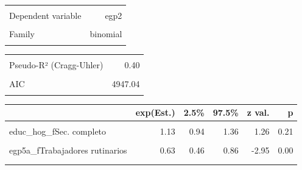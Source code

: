 \documentclass[
]{book}
\begin{document}
\begin{table}[!h]
\centering
\begin{tabular}{lr}
\toprule
\cellcolor{gray!6}{Observations} & \cellcolor{gray!6}{5900 (1560 missing obs. deleted)}\\
Dependent variable & egp2\\
\cellcolor{gray!6}{Type} & \cellcolor{gray!6}{Generalized linear model}\\
Family & binomial\\
\cellcolor{gray!6}{Link} & \cellcolor{gray!6}{logit}\\
\bottomrule
\end{tabular}
\end{table} \begin{table}[!h]
\centering
\begin{tabular}{lr}
\toprule
\cellcolor{gray!6}{$\chi^2$(9)} & \cellcolor{gray!6}{1899.04}\\
Pseudo-R² (Cragg-Uhler) & 0.40\\
\cellcolor{gray!6}{Pseudo-R² (McFadden)} & \cellcolor{gray!6}{0.28}\\
AIC & 4947.04\\
\cellcolor{gray!6}{BIC} & \cellcolor{gray!6}{5013.87}\\
\bottomrule
\end{tabular}
\end{table} \begin{table}[!h]
\centering
\begin{threeparttable}
\begin{tabular}{lrrrrr}
\toprule
  & exp(Est.) & 2.5\% & 97.5\% & z val. & p\\
\midrule
\cellcolor{gray!6}{(Intercept)} & \cellcolor{gray!6}{0.13} & \cellcolor{gray!6}{0.11} & \cellcolor{gray!6}{0.17} & \cellcolor{gray!6}{-16.01} & \cellcolor{gray!6}{0.00}\\
educ\_hog\_fSec. completo & 1.13 & 0.94 & 1.36 & 1.26 & 0.21\\
\cellcolor{gray!6}{educ\_hog\_fSuperior completo} & \cellcolor{gray!6}{1.19} & \cellcolor{gray!6}{0.92} & \cellcolor{gray!6}{1.53} & \cellcolor{gray!6}{1.34} & \cellcolor{gray!6}{0.18}\\
egp5a\_fTrabajadores rutinarios & 0.63 & 0.46 & 0.86 & -2.95 & 0.00\\
\cellcolor{gray!6}{egp5a\_fPequeña Burguesía} & \cellcolor{gray!6}{0.64} & \cellcolor{gray!6}{0.51} & \cellcolor{gray!6}{0.80} & \cellcolor{gray!6}{-3.90} & \cellcolor{gray!6}{0.00}\\
\addlinespace

\end{tabular}
\end{threeparttable}
\end{table}
\end{document}

